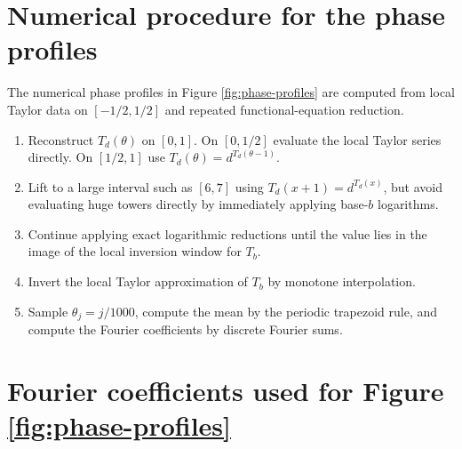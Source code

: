 \documentclass[11pt,a4paper]{article}
\theoremstyle{plain}
\theoremstyle{definition}
\theoremstyle{remark}
\begin{document}
\appendix

\section{Numerical procedure for the phase profiles}

The numerical phase profiles in Figure \ref{fig:phase-profiles} are computed from local Taylor data on $[-1/2,1/2]$ and repeated functional-equation reduction.

\begin{enumerate}[leftmargin=2em]
  \item Reconstruct $T_d(\theta)$ on $[0,1]$.  On $[0,1/2]$ evaluate the local Taylor series directly.  On $[1/2,1]$ use $T_d(\theta)=d^{T_d(\theta-1)}$.
  \item Lift to a large interval such as $[6,7]$ using $T_d(x+1)=d^{T_d(x)}$, but avoid evaluating huge towers directly by immediately applying base-$b$ logarithms.
  \item Continue applying exact logarithmic reductions until the value lies in the image of the local inversion window for $T_b$.
  \item Invert the local Taylor approximation of $T_b$ by monotone interpolation.
  \item Sample $\theta_j=j/1000$, compute the mean by the periodic trapezoid rule, and compute the Fourier coefficients by discrete Fourier sums.
\end{enumerate}

\section{Fourier coefficients used for Figure \ref{fig:phase-profiles}}
\end{document}
